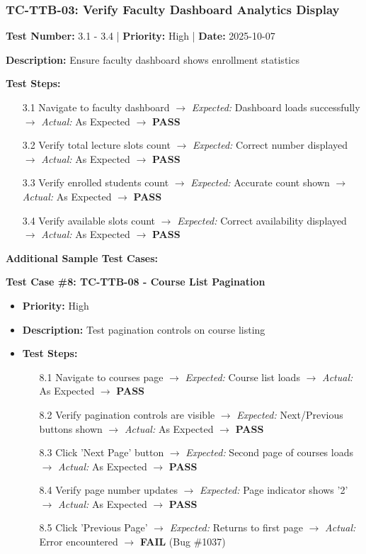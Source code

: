 \subsubsection{TC-TTB-03: Verify Faculty Dashboard Analytics Display}

\textbf{Test Number:} 3.1 - 3.4 | \textbf{Priority:} High | \textbf{Date:} 2025-10-07

\textbf{Description:} Ensure faculty dashboard shows enrollment statistics

\textbf{Test Steps:}
\begin{enumerate}[leftmargin=*]
    \item[3.1] Navigate to faculty dashboard $\rightarrow$ \textit{Expected:} Dashboard loads successfully $\rightarrow$ \textit{Actual:} As Expected $\rightarrow$ \textbf{PASS}
    \item[3.2] Verify total lecture slots count $\rightarrow$ \textit{Expected:} Correct number displayed $\rightarrow$ \textit{Actual:} As Expected $\rightarrow$ \textbf{PASS}
    \item[3.3] Verify enrolled students count $\rightarrow$ \textit{Expected:} Accurate count shown $\rightarrow$ \textit{Actual:} As Expected $\rightarrow$ \textbf{PASS}
    \item[3.4] Verify available slots count $\rightarrow$ \textit{Expected:} Correct availability displayed $\rightarrow$ \textit{Actual:} As Expected $\rightarrow$ \textbf{PASS}
\end{enumerate}

\textbf{Additional Sample Test Cases:}

\textbf{Test Case \#8: TC-TTB-08 - Course List Pagination}
\begin{itemize}[leftmargin=*]
    \item \textbf{Priority:} High
    \item \textbf{Description:} Test pagination controls on course listing
    \item \textbf{Test Steps:}
    \begin{enumerate}[leftmargin=*]
        \item[8.1] Navigate to courses page $\rightarrow$ \textit{Expected:} Course list loads $\rightarrow$ \textit{Actual:} As Expected $\rightarrow$ \textbf{PASS}
        \item[8.2] Verify pagination controls are visible $\rightarrow$ \textit{Expected:} Next/Previous buttons shown $\rightarrow$ \textit{Actual:} As Expected $\rightarrow$ \textbf{PASS}
        \item[8.3] Click 'Next Page' button $\rightarrow$ \textit{Expected:} Second page of courses loads $\rightarrow$ \textit{Actual:} As Expected $\rightarrow$ \textbf{PASS}
        \item[8.4] Verify page number updates $\rightarrow$ \textit{Expected:} Page indicator shows '2' $\rightarrow$ \textit{Actual:} As Expected $\rightarrow$ \textbf{PASS}
        \item[8.5] Click 'Previous Page' $\rightarrow$ \textit{Expected:} Returns to first page $\rightarrow$ \textit{Actual:} Error encountered $\rightarrow$ \textbf{FAIL} (Bug \#1037)
    \end{enumerate}
\end{itemize}

